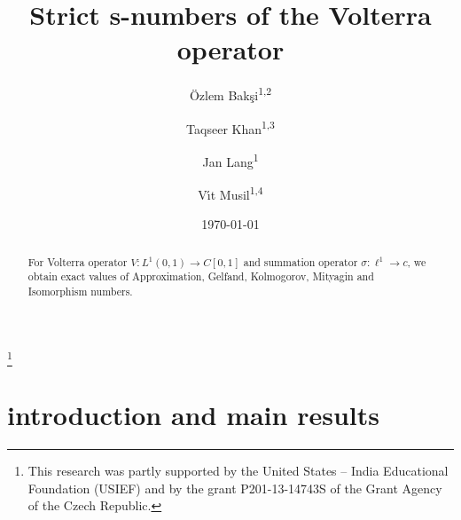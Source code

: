 \documentclass[10pt,reqno]{amsart}
\numberwithin{equation}{section}
\def\LI{{L^1(0,1)}}
\def\li{{\ell^1}}
\def\LInf{{C[0,1]}}
\def\linf{{c}}
\begin{document}
\title{Strict s-numbers of the Volterra operator}

\begin{abstract}
For Volterra operator $V\colon \LI \to \LInf$
and summation operator $\sigma\colon \li \to \linf$,
we obtain exact values of Approximation, Gelfand,
Kolmogorov, Mityagin and Isomorphism numbers.
\end{abstract}


\author[\"O. Bak\c si]{\"{O}zlem Bak\c{s}i\textsuperscript{1,2}}
\author[T. Khan]{Taqseer Khan\textsuperscript{1,3}}
\author[J. Lang]{Jan Lang\textsuperscript{1}}
\author[V. Musil]{V\'\i t Musil\textsuperscript{1,4}}



\address{\textsuperscript{1}%
Department of Mathematics,
Ohio State University,
Columbus OH,
43210-1174 USA}

\address{\textsuperscript{2}%
Yildiz Technical University,
Faculty of Art and Science,
Department of Mathematics,
Istanbul,
Turkey}

\address{\textsuperscript{3}%
Aligarh Muslim University,
Aligarh, U.P.-202002,
India}

\address{\textsuperscript{4}%
Department of Mathematical Analysis,
Faculty of Mathematics and Physics, 
Charles University,
So\-ko\-lo\-vsk\'a~83,
186~75 Praha~8,
Czech Republic}  

\date{\today}


\thanks{%
This research was partly supported
by the United States -- India Educational Foundation (USIEF)
and by the grant P201-13-14743S of the Grant Agency of the Czech Republic.
}

\maketitle




\section{introduction and main results}
\end{document}
